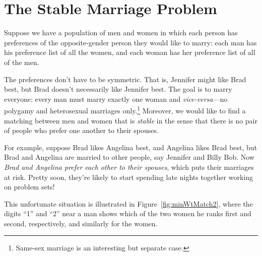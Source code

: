 \begin{problems}

\practiceproblems
{}

\homeworkproblems
{}


\classproblems
{}

\examproblems
{}
\end{problems}


\section{The Stable Marriage Problem}
\label{stablemarriagesec}
Suppose we have a population of men and women in which each person has
preferences of the opposite-gender person they would like to marry:
each man has his preference list of all the women, and each woman has
her preference list of all of the men.

The preferences don't have to be symmetric.  That is, Jennifer might
like Brad best, but Brad doesn't necessarily like Jennifer best.  The
goal is to marry everyone: every man must marry exactly one woman and
\emph{vice-versa}---no polygamy and heterosexual marriages
only.\footnote{Same-sex marriage is an interesting but separate case.}
Moreover, we would like to find a
matching between men and women that is \emph{stable} in the sense that
there is no pair of people who prefer one another to their spouses.

For example, suppose Brad likes Angelina best, and Angelina likes Brad
best, but Brad and Angelina are married to other people, say Jennifer
and Billy Bob.  Now \emph{Brad and Angelina prefer each other to their
  spouses}, which puts their marriages at risk.  Pretty soon, they're
likely to start spending late nights together working on problem sets!

This unfortunate situation is illustrated in
Figure~\ref{fig:minWtMatch2}, where the digits ``1'' and ``2'' near a
man shows which of the two women he ranks first and second,
respectively, and similarly for the women.

